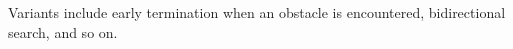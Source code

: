 Variants include early termination when an obstacle is encountered, bidirectional search, and so on. 
        
